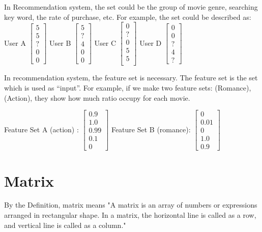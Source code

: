 \documentclass[paper=a4, fontsize=11pt]{scrartcl} %
\numberwithin{equation}{section} %
\numberwithin{figure}{section} %
\numberwithin{table}{section} %
\begin{document}
In Recommendation system, the set could be the group of movie genre, searching key word, the rate of purchase, etc. For example, the set could be described as:
User A
\(
\begin{bmatrix}
5\\5\\?\\0\\0
\end{bmatrix}
\) User B \(
\begin{bmatrix}
5\\?\\4\\0\\0
\end{bmatrix}
\) User C \(
\begin{bmatrix}
0\\?\\0\\5\\5\\
\end{bmatrix}
\) User D  \(
\begin{bmatrix}
0\\0\\?\\4\\?
\end{bmatrix}
\)

\bigskip
In recommendation system, the feature set is necessary. The feature set is the set which is used as “input”. For example, if we make two feature sets: (Romance), (Action), they show how much ratio occupy for each movie.

Feature Set A (action) :
\(
\begin{bmatrix}
0.9\\1.0\\0.99\\0.1\\0
\end{bmatrix}
\) Feature Set B (romance):
\(
\begin{bmatrix}
0\\0.01\\0\\1.0\\0.9
\end{bmatrix}
\)

\bigskip
\section{Matrix}
By the Definition, matrix means "A matrix is an array of numbers or expressions arranged in rectangular shape. In a matrix, the horizontal line is called as a row, and vertical line is called as a column."
\end{document}
